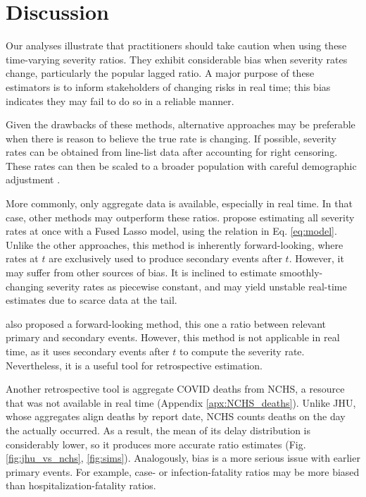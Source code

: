 \documentclass{article}
\begin{document}
\section{Discussion}

Our analyses illustrate that practitioners should take caution when using these time-varying severity ratios. They exhibit considerable bias when severity rates change, particularly the popular lagged ratio. A major purpose of these estimators is to inform stakeholders of changing risks in real time; this bias indicates they may fail to do so in a reliable manner.

Given the drawbacks of these methods, alternative approaches may be preferable when there is reason to believe the true rate is changing. If possible, severity rates can be obtained from line-list data after accounting for right censoring. These rates can then be scaled to a broader population with careful demographic adjustment \citep{verity2020estimates}. 

More commonly, only aggregate data is available, especially in real time. In that case, other methods may outperform these ratios. \citet{fusedlasso} propose estimating all severity rates at once with a Fused Lasso model, using the relation in Eq. \eqref{eq:model}. Unlike the other approaches, this method is inherently forward-looking, where rates at $t$ are exclusively used to produce secondary events after $t$. However, it may suffer from other sources of bias. It is inclined to estimate smoothly-changing severity rates as piecewise constant, and may yield unstable real-time estimates due to scarce data at the tail.

\citet{UKpaper} also proposed a forward-looking method, this one a ratio between relevant primary and secondary events. However, this method is not applicable in real time, as it uses secondary events after $t$ to compute the severity rate. Nevertheless, it is a useful tool for retrospective estimation. 

Another retrospective tool is aggregate COVID deaths from NCHS, a resource that was not available in real time (Appendix \ref{apx:NCHS_deaths}). Unlike JHU, whose aggregates align deaths by report date, NCHS counts deaths on the day the actually occurred. As a result, the mean of its delay distribution is considerably lower, so it produces more accurate ratio estimates (Fig. \ref{fig:jhu_vs_nchs}, \ref{fig:sims}). Analogously, bias is a more serious issue with earlier primary events. For example, case- or infection-fatality ratios may be more biased than hospitalization-fatality ratios. 
\end{document}

